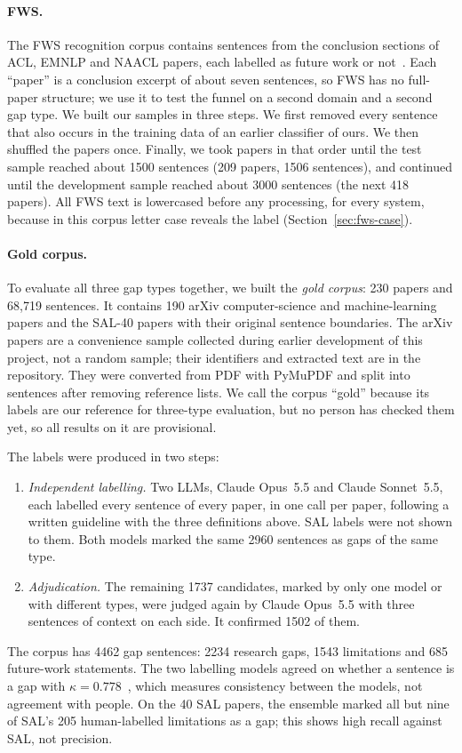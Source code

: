 \paragraph{FWS.} The FWS recognition corpus contains sentences from the conclusion sections of ACL, EMNLP and NAACL papers, each labelled as future work or not~\cite{hao2020acl,zhang2023fws,fwsrepo}. Each ``paper'' is a conclusion excerpt of about seven sentences, so FWS has no full-paper structure; we use it to test the funnel on a second domain and a second gap type. We built our samples in three steps. We first removed every sentence that also occurs in the training data of an earlier classifier of ours. We then shuffled the papers once. Finally, we took papers in that order until the test sample reached about 1500 sentences (209 papers, 1506 sentences), and continued until the development sample reached about 3000 sentences (the next 418 papers). All FWS text is lowercased before any processing, for every system, because in this corpus letter case reveals the label (Section~\ref{sec:fws-case}).

\paragraph{Gold corpus.} To evaluate all three gap types together, we built the \emph{gold corpus}: 230 papers and 68,719 sentences. It contains 190 arXiv computer-science and machine-learning papers and the SAL-40 papers with their original sentence boundaries. The arXiv papers are a convenience sample collected during earlier development of this project, not a random sample; their identifiers and extracted text are in the repository. They were converted from PDF with PyMuPDF and split into sentences after removing reference lists. We call the corpus ``gold'' because its labels are our reference for three-type evaluation, but no person has checked them yet, so all results on it are provisional.

The labels were produced in two steps:
\begin{enumerate}
  \item \emph{Independent labelling.} Two LLMs, Claude Opus~5.5 and Claude Sonnet~5.5, each labelled every sentence of every paper, in one call per paper, following a written guideline with the three definitions above. SAL labels were not shown to them. Both models marked the same 2960 sentences as gaps of the same type.
  \item \emph{Adjudication.} The remaining 1737 candidates, marked by only one model or with different types, were judged again by Claude Opus~5.5 with three sentences of context on each side. It confirmed 1502 of them.
\end{enumerate}
The corpus has 4462 gap sentences: 2234 research gaps, 1543 limitations and 685 future-work statements. The two labelling models agreed on whether a sentence is a gap with $\kappa = 0.778$~\cite{cohen1960kappa}, which measures consistency between the models, not agreement with people. On the 40 SAL papers, the ensemble marked all but nine of SAL's 205 human-labelled limitations as a gap; this shows high recall against SAL, not precision.

